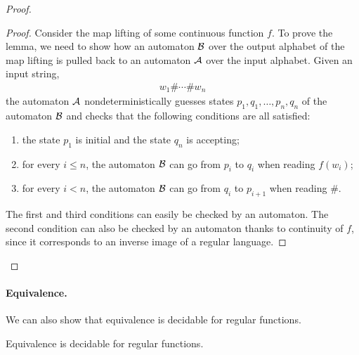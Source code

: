 \begin{proof}
    \begin{proof}
Consider the map lifting of some continuous  function $f$. To prove the lemma, we need to show how an automaton ${\mathcal B}$ over the output alphabet of the map lifting  is pulled back to an automaton ${\mathcal A}$ over the input alphabet.    Given an input string, 
\begin{align*}
w_1 \# \cdots \# w_n
\end{align*}
the automaton ${\mathcal A}$ 
nondeterministically guesses states $p_1,q_1,\ldots,p_n,q_n$ of  the automaton  ${\mathcal B}$ and checks that the following conditions are all satisfied:
\begin{enumerate}
    \item the state $p_1$ is initial and the state $q_n$ is accepting;
    \item for every $i\leq n$, the automaton ${\mathcal B}$ can go from $p_i$ to $q_i$ when reading $f(w_i)$;
    \item for every $i < n$, the automaton ${\mathcal B}$ can go from $q_i$ to $p_{i+1}$ when reading $\#$.
\end{enumerate}
The first and third conditions can easily be checked by an automaton. 
The second condition can also  be checked by an automaton thanks to continuity of $f$, since it corresponds to an inverse image of a regular language. 
    \end{proof}

\end{proof}

\paragraph*{Equivalence.} We can also show that equivalence is decidable for regular functions.
\begin{theorem}\label{thm:decidable-equivalence-regular}
    Equivalence is decidable for regular functions.
\end{theorem}

